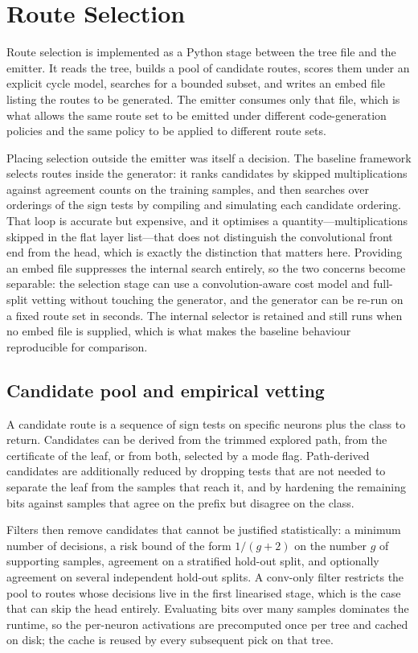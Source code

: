 \section{Route Selection}
\label{sec:impl-routes}

Route selection is implemented as a Python stage between the tree file and the emitter.
It reads the tree, builds a pool of candidate routes, scores them under an explicit cycle model, searches for a bounded subset, and writes an embed file listing the routes to be generated.
The emitter consumes only that file, which is what allows the same route set to be emitted under different code-generation policies and the same policy to be applied to different route sets.

Placing selection outside the emitter was itself a decision.
The baseline framework selects routes inside the generator: it ranks candidates by skipped multiplications against agreement counts on the training samples, and then searches over orderings of the sign tests by compiling and simulating each candidate ordering.
That loop is accurate but expensive, and it optimises a quantity---multiplications skipped in the flat layer list---that does not distinguish the convolutional front end from the head, which is exactly the distinction that matters here.
Providing an embed file suppresses the internal search entirely, so the two concerns become separable: the selection stage can use a convolution-aware cost model and full-split vetting without touching the generator, and the generator can be re-run on a fixed route set in seconds.
The internal selector is retained and still runs when no embed file is supplied, which is what makes the baseline behaviour reproducible for comparison.

\subsection{Candidate pool and empirical vetting}

A candidate route is a sequence of sign tests on specific neurons plus the class to return.
Candidates can be derived from the trimmed explored path, from the certificate of the leaf, or from both, selected by a mode flag.
Path-derived candidates are additionally reduced by dropping tests that are not needed to separate the leaf from the samples that reach it, and by hardening the remaining bits against samples that agree on the prefix but disagree on the class.

Filters then remove candidates that cannot be justified statistically: a minimum number of decisions, a risk bound of the form \(1/(g+2)\) on the number \(g\) of supporting samples, agreement on a stratified hold-out split, and optionally agreement on several independent hold-out splits.
A conv-only filter restricts the pool to routes whose decisions live in the first linearised stage, which is the case that can skip the head entirely.
Evaluating bits over many samples dominates the runtime, so the per-neuron activations are precomputed once per tree and cached on disk; the cache is reused by every subsequent pick on that tree.

